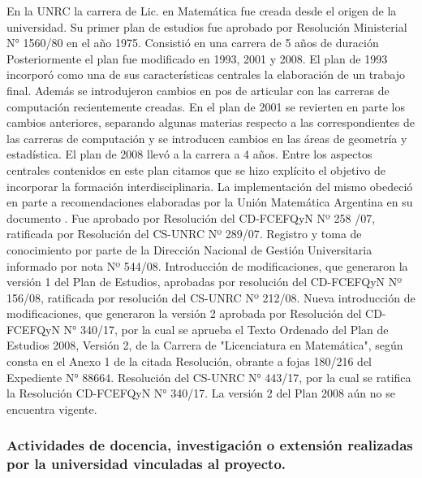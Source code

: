 \documentclass[a4paper, 12pt]{article}
\begin{document}
 En la UNRC la carrera de Lic. en Matemática fue creada desde el origen de la universidad. Su primer plan de estudios fue aprobado por Resolución Ministerial  N° 1560/80 en el año 1975. Consistió en una carrera de 5 años de duración Posteriormente el plan fue modificado en 1993, 2001 y 2008. El plan de 1993 incorporó como una de sus características centrales la elaboración de un trabajo final. Además se introdujeron cambios en pos de articular con las carreras de computación recientemente creadas.  En el plan de 2001 se revierten en parte los cambios anteriores, separando algunas  materias respecto a las correspondientes de las carreras de  computación y se introducen cambios en las áreas de geometría y estadística.  
 El plan de  2008 llevó a la carrera a 4 años. Entre los aspectos centrales contenidos en este plan citamos que se hizo explícito el objetivo de incorporar la formación interdisciplinaria. La implementación del mismo obedeció en parte a recomendaciones elaboradas por la Unión Matemática Argentina en su documento \cite{uma}.  Fue aprobado por Resolución del CD-FCEFQyN Nº 258 /07, ratificada 
por Resolución del CS-UNRC Nº 289/07. Registro y toma de conocimiento 
por parte de la Dirección Nacional de Gestión Universitaria informado por nota 
Nº 544/08. Introducción de modificaciones, que generaron la versión 1 del Plan 
de Estudios, aprobadas por resolución del CD-FCEFQyN Nº 156/08, 
ratificada por resolución del CS-UNRC Nº 212/08.  Nueva introducción de modificaciones, que generaron la versión 2 aprobada por Resolución del CD-FCEFQyN N° 340/17, por la cual se aprueba el Texto Ordenado del Plan de Estudios 2008, Versión 2, de la Carrera de "Licenciatura en Matemática", según consta en el Anexo 1 de la citada Resolución, obrante a fojas 180/216 del Expediente N° 88664.  Resolución del CS-UNRC N° 443/17, por la cual se ratifica la Resolución  CD-FCEFQyN N° 340/17.  La versión 2 del Plan 2008 aún no se encuentra vigente. 




\subsubsection{Actividades de docencia, investigación o extensión realizadas por la universidad vinculadas  al proyecto.}
\end{document}
